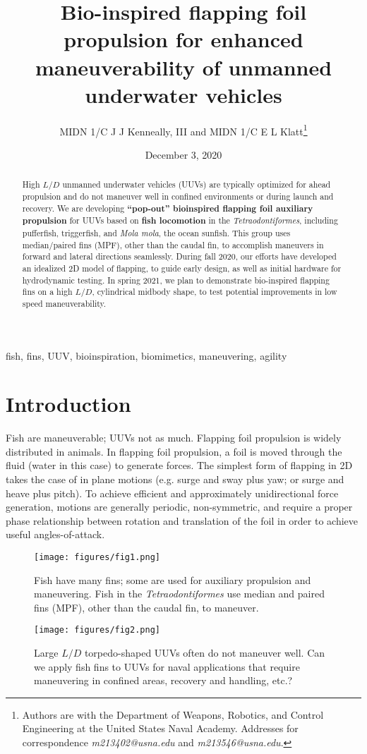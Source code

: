 \documentclass[twocolumn,10pt]{IEEEtran}
\title{Bio-inspired flapping foil propulsion for enhanced maneuverability of unmanned underwater vehicles}
\author{MIDN 1/C J J Kenneally, III and MIDN 1/C E L  Klatt\thanks{Authors are with the Department of Weapons, Robotics, and Control Engineering at the United States Naval Academy. Addresses for correspondence \emph{m213402@usna.edu} and \emph{m213546@usna.edu}.}}
\date{December 3, 2020}
\begin{document}
\maketitlepage
\maketitle
\begin{abstract}
High $L/D$ unmanned underwater vehicles (UUVs) are typically optimized for ahead propulsion and do not maneuver well in confined environments or during launch and recovery.  We are developing \textbf{``pop-out'' bioinspired flapping foil auxiliary propulsion} for UUVs based on \textbf{fish locomotion} in the \emph{Tetraodontiformes}, including pufferfish, triggerfish, and \emph{Mola mola}, the ocean sunfish.  This group uses median/paired fins (MPF), other than the caudal fin, to accomplish maneuvers in forward and lateral directions seamlessly.  During fall 2020, our efforts have developed an idealized 2D model of flapping, to guide early design, as well as initial hardware for hydrodynamic testing. In spring 2021, we plan to demonstrate bio-inspired flapping fins on a high $L/D$, cylindrical midbody shape, to test potential improvements in low speed maneuverability.
\end{abstract}

\begin{IEEEkeywords}
fish, fins, UUV, bioinspiration, biomimetics, maneuvering, agility
\end{IEEEkeywords}


\section{Introduction}
Fish are maneuverable; UUVs not as much. Flapping foil propulsion is widely distributed in animals. In flapping foil propulsion, a foil is moved through the fluid (water in this case) to generate forces. The simplest form of flapping in 2D takes the case of in plane motions (e.g. surge and sway plus yaw; or surge and heave plus pitch). To achieve efficient and approximately unidirectional force generation, motions are generally periodic, non-symmetric, and require a proper phase relationship between rotation and translation of the foil in order to achieve useful angles-of-attack.
\begin{figure}[h]
\begin{center}
\texttt{[image: figures/fig1.png]}
\end{center}
\caption{Fish have many fins; some are used for auxiliary propulsion and maneuvering.  Fish in the \emph{Tetraodontiformes} use median and paired fins (MPF), other than the caudal fin, to maneuver.}
\end{figure}
\begin{figure}[h]
\begin{center}
\texttt{[image: figures/fig2.png]}
\end{center}
\caption{Large $L/D$ torpedo-shaped UUVs often do not maneuver well. Can we apply fish fins to UUVs for naval applications that require maneuvering in confined areas, recovery and handling, etc.?}
\end{figure}
\end{document}
